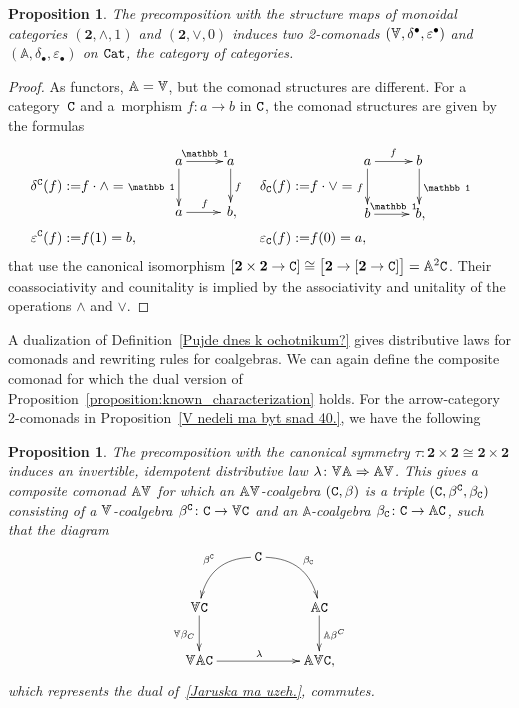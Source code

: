 \documentclass[12pt,leqno]{amsart}
\newtheorem{proposition}[theorem]{Proposition}
\theoremstyle{definition}
\def\Ar{\mathbb{A}}
\def\ee{\varepsilon}
\def\id{{\mathbb 1}}
\newcommand{\C}{{\tt C}}
\newcommand{\Cat}{{\tt Cat}}
\newcommand{\4}{\texttt{4}}
\newcommand{\x}{\times}
\newcommand{\jed}{\mathbf{1}}
\def\dvedve{\mathbf{2}}
\newcommand{\Vr}{\text{\raisebox{\depth}{\scalebox{1}[-1]{$\Ar$}}}}
\begin{document}
\begin{proposition}
\label{V nedeli ma byt snad 40.}
The precomposition with the structure maps of monoidal categories
$(\dvedve,\wedge,1)$ and $(\dvedve,\vee,0)$ induces two 2-comonads
$ (\Vr,\delta^\bullet,\ee^\bullet)$ and
$(\Ar,\delta_\bullet,\ee_\bullet)$ on \/$\Cat$, the category of
categories.
\end{proposition}

\begin{proof}
As functors, $\Ar = \Vr$, but the comonad structures are different. 
For a category~$\C$ and a~morphism 
$f\colon a\to b$ in $\C$, the comonad structures are given by the formulas
    \begin{align*}
    \label{equation:4-square}
    \raisebox{-1.8em}{$\delta^\C(f):=$}&\raisebox{-1.8em}{$f\cdot \wedge=$}
\xymatrix{a\ar[r]^{\id} \ar[d]_{\id}  &a  \ar[d]^{f} 
\\
a\ar[r]^{f} & \, b,
}&
 \raisebox{-1.8em}{$\delta_\C(f):=$}&\raisebox{-1.8em}{$f\cdot \vee=$}
\xymatrix{a\ar[r]^{f} \ar[d]_{f}  &b  \ar[d]^{\id} 
\\
b\ar[r]^{\id} & \, b,
}\\
 \ee^\C(f):=& f(1)= b,&
\ee_\C(f):=&f(0)=a, &
\end{align*}
that use the canonical isomorphism $[\dvedve\x\dvedve\to \C]\cong
\big[\dvedve\to[\dvedve\to \C]\big]=\Ar^2 \C $.
Their coassociativity and counitality is implied by the
associativity and unitality of the operations $\wedge$ and $\vee$. 
\end{proof}

A dualization of Definition~\ref{Pujde dnes k ochotnikum?}
gives distributive laws for comonads and rewriting rules for
coalgebras. We can again define the composite comonad for which the
dual version of Proposition~\ref{proposition:known_characterization}
holds. For the arrow-category 2-comonads in Proposition~\ref{V nedeli
  ma byt snad 40.}, we have the following

\begin{proposition}
\label{proposition:composite_comonad}
The precomposition with the canonical symmetry
$\tau\colon\dvedve\x\dvedve\cong \dvedve\x\dvedve$ induces
an invertible, idempotent distributive law
$\lambda \colon \Vr\Ar \Rightarrow \Ar\Vr$. This gives a
composite comonad $\Ar\Vr$ for which an $\Ar\Vr$-coalgebra $(\C,\beta)$
is a triple $(\C,\beta^\C,\beta_\C)$ consisting of a $\Vr$-coalgebra
$\beta^\C\colon \C\to \Vr\C$ and an $\Ar$-coalgebra
$\beta_\C\colon \C\to \Ar\C$, such that the diagram
\begin{equation}
\label{Zitra ma Dominik zkousku.}
\xymatrix{
  &\C  \ar@/_1.3em/[ld]_{\beta^\C}\ar@/^1.3em/[rd]^{\beta_\C}
\\
\Vr\C \ar[d]_{\Vr\beta_C}  && \Ar\C \ar[d]^{\Ar\beta^C}
\\
\Vr\Ar\C  \ar[rr]^\lambda  &&\Ar\Vr\C,
}
\end{equation}
which represents the dual of~\eqref{Jaruska ma uzeh.}, commutes.
\end{proposition}
\end{document}
